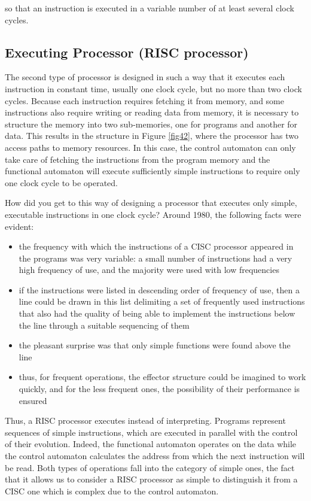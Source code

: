 so that an instruction is executed in a variable number of at least several clock cycles.

\subsection{Executing Processor (RISC processor)}

The second type of processor is designed in such a way that it executes each instruction in constant time, usually one clock cycle, but no more than two clock cycles. Because each instruction requires fetching it from memory, and some instructions also require writing or reading data from memory, it is necessary to structure the memory into two sub-memories, one for programs and another for data. This results in the structure in Figure \ref{fig42}, where the processor has two access paths to memory resources.
In this case, the control automaton can only take care of fetching the instructions from the program memory and the functional automaton will execute sufficiently simple instructions to require only one clock cycle to be operated.

How did you get to this way of designing a processor that executes only simple, executable instructions in one clock cycle? Around 1980, the following facts were evident:


\begin{itemize}
    \item the frequency with which the instructions of a CISC processor appeared in the programs was very variable: a small number of instructions had a very high frequency of use, and the majority were used with low frequencies

    \item if the instructions were listed in descending order of frequency of use, then a line could be drawn in this list delimiting a set of frequently used instructions that also had the quality of being able to implement the instructions below the line through a suitable sequencing of them

    \item the pleasant surprise was that only simple functions were found above the line

    \item thus, for frequent operations, the effector structure could be imagined to work quickly, and for the less frequent ones, the possibility of their performance is ensured
\end{itemize}
Thus, a RISC processor executes instead of interpreting. Programs represent sequences of simple instructions, which are executed in parallel with the control of their evolution. Indeed, the functional automaton operates on the data while the control automaton calculates the address from which the next instruction will be read.
Both types of operations fall into the category of simple ones, the fact that it allows us to consider a RISC processor as simple to distinguish it from a CISC one which is complex due to the control automaton.




